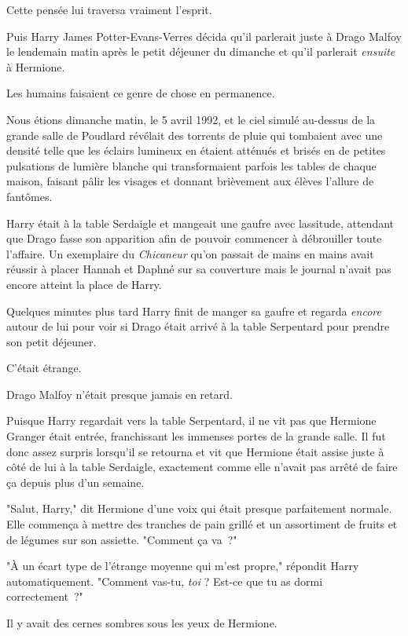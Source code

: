 Cette pensée lui traversa vraiment l'esprit.

Puis Harry James Potter-Evans-Verres décida qu'il parlerait juste à Drago Malfoy le lendemain matin après le petit déjeuner du dimanche et qu'il parlerait \emph{ensuite} à Hermione.

Les humains faisaient ce genre de chose en permanence.

\later

Nous étions dimanche matin, le 5 avril 1992, et le ciel simulé au-dessus de la grande salle de Poudlard révélait des torrents de pluie qui tombaient avec une densité telle que les éclairs lumineux en étaient atténués et brisés en de petites pulsations de lumière blanche qui transformaient parfois les tables de chaque maison, faisant pâlir les visages et donnant brièvement aux élèves l'allure de fantômes.

Harry était à la table Serdaigle et mangeait une gaufre avec lassitude, attendant que Drago fasse son apparition afin de pouvoir commencer à débrouiller toute l'affaire. Un exemplaire du \emph{Chicaneur} qu'on passait de mains en mains avait réussir à placer Hannah et Daphné sur sa couverture mais le journal n'avait pas encore atteint la place de Harry.

Quelques minutes plus tard Harry finit de manger sa gaufre et regarda \emph{encore} autour de lui pour voir si Drago était arrivé à la table Serpentard pour prendre son petit déjeuner.

C'était étrange.

Drago Malfoy n'était presque jamais en retard.

Puisque Harry regardait vers la table Serpentard, il ne vit pas que Hermione Granger était entrée, franchissant les immenses portes de la grande salle. Il fut donc assez surpris lorsqu'il se retourna et vit que Hermione était assise juste à côté de lui à la table Serdaigle, exactement comme elle n'avait pas arrêté de faire ça depuis plus d'un semaine.

"Salut, Harry," dit Hermione d'une voix qui était presque parfaitement normale. Elle commença à mettre des tranches de pain grillé et un assortiment de fruits et de légumes sur son assiette. "Comment ça va~?"

"À un écart type de l'étrange moyenne qui m'est propre," répondit Harry automatiquement. "Comment vas-tu, \emph{toi} ? Est-ce que tu as dormi correctement~?"

Il y avait des cernes sombres sous les yeux de Hermione.


